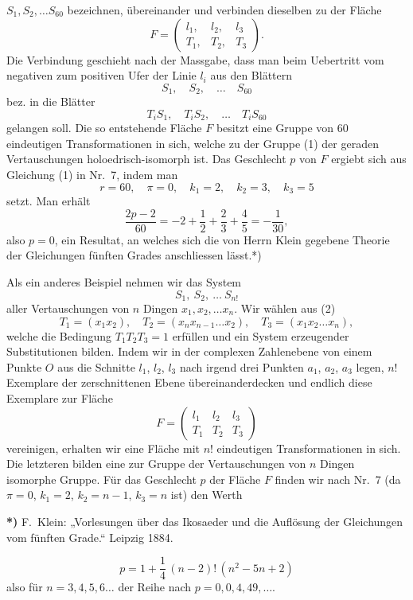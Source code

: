 \documentclass{article}
\begin{document}
$S_1, S_2, \dots S_{60}$ bezeichnen, übereinander und verbinden dieselben zu der Fläche
\[
F = \begin{pmatrix} l_1, & l_2, & l_3 \\ T_1, & T_2, & T_3 \end{pmatrix}.
\]
Die Verbindung geschieht nach der Massgabe, dass man beim Uebertritt vom negativen zum positiven Ufer der Linie $l_i$ aus den Blättern
\[
S_1, \quad S_2, \quad \dots \quad S_{60}
\]
bez. in die Blätter
\[
T_i S_1, \quad T_i S_2, \quad \dots \quad T_i S_{60}
\]
gelangen soll. Die so entstehende Fläche $F$ besitzt eine Gruppe von 60 eindeutigen Transformationen in sich, welche zu der Gruppe (1) der geraden Vertauschungen holoedrisch-isomorph ist. Das Geschlecht $p$ von $F$ ergiebt sich aus Gleichung (1) in Nr.~7, indem man
\[
r = 60, \quad \pi = 0, \quad k_1 = 2, \quad k_2 = 3, \quad k_3 = 5
\]
setzt. Man erhält
\[
\frac{2p - 2}{60} = - 2 + \frac{1}{2} + \frac{2}{3} + \frac{4}{5} = - \frac{1}{30},
\]
also $p = 0$, ein Resultat, an welches sich die von Herrn Klein gegebene Theorie der Gleichungen fünften Grades anschliessen lässt.*)

Als ein anderes Beispiel nehmen wir das System
\[
S_1, \ S_2, \ \dots \ S_{n!}
\tag{2}
\]
aller Vertauschungen von $n$ Dingen $x_1, x_2, \dots x_n$. Wir wählen aus (2)
\[
T_1 = (x_1 x_2), \quad T_2 = (x_n x_{n-1} \dots x_2), \quad T_3 = (x_1 x_2 \dots x_n),
\]
welche die Bedingung $T_1 T_2 T_3 = 1$ erfüllen und ein System erzeugender Substitutionen bilden. Indem wir in der complexen Zahlenebene von einem Punkte $O$ aus die Schnitte $l_1$, $l_2$, $l_3$ nach irgend drei Punkten $a_1$, $a_2$, $a_3$ legen, $n!$ Exemplare der zerschnittenen Ebene übereinanderdecken und endlich diese Exemplare zur Fläche
\[
F = \begin{pmatrix} l_1 & l_2 & l_3 \\ T_1 & T_2 & T_3 \end{pmatrix}
\]
vereinigen, erhalten wir eine Fläche mit $n!$ eindeutigen Transformationen in sich. Die letzteren bilden eine zur Gruppe der Vertauschungen von $n$ Dingen isomorphe Gruppe. Für das Geschlecht $p$ der Fläche $F$ finden wir nach Nr.~7 (da $\pi = 0$, $k_1 = 2$, $k_2 = n - 1$, $k_3 = n$ ist) den Werth

\textbf{*)} F.~Klein: „Vorlesungen über das Ikosaeder und die Auflösung der Gleichungen vom fünften Grade.“ Leipzig 1884.

\[
p = 1 + \frac{1}{4}\,(n - 2)!\,(n^2 - 5n + 2)
\tag{3}
\]
also für $n = 3, 4, 5, 6 \dots$ der Reihe nach $p = 0, 0, 4, 49, \dots$.
\end{document}
